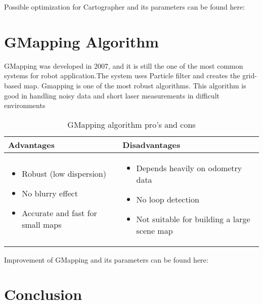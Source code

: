 \documentclass[12pt, a4paper, onecolumn]{article}
\begin{document}
Possible optimization for Cartographer and its parameters can be found here: \cite{CARTO19}
\section{GMapping Algorithm}
GMapping was developed in 2007, and it is still the one of the most common systems for robot application.The system uses Particle ﬁlter and creates the grid-based map. Gmapping is one of the most robust algorithms. This algorithm is good in handling noisy data and short laser measurements in difficult environments \cite{SLAMbench17}
\begin{table}[h!]
\centering
\begin{tabular}{ |p{6cm}||p{6cm}|  }
 \hline
 Advantages&Disadvantages\\
 \hline
\begin{itemize}
  \item Robust (low dispersion) \cite{SLAMQuality}
  \item No blurry effect \cite{SLAMQuality}
  \item Accurate and fast for small maps \cite{SLAMQuality20}
  \end{itemize} 
  & 
  \begin{itemize}
  \item Depends heavily on odometry data
  \item No loop detection \cite{SLAMQuality20}
  \item Not suitable for building a large scene map \cite{SLAMQuality20}
  \end{itemize} \\

 \hline
\end{tabular}
\caption{GMapping algorithm pro's and cons}
\label{table:2}
\end{table}

Improvement of GMapping and its parameters can be found here: \cite{SLAMQuality20}

\section{Conclusion}

\end{document}
